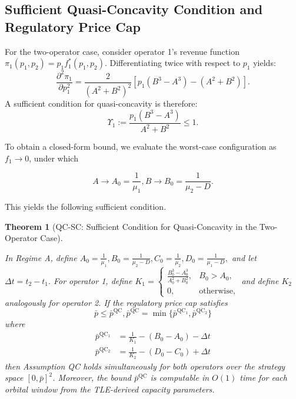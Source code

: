 \documentclass[review,3p,authoryear]{elsarticle}
\newtheorem{theorem}{Theorem}[section]
\begin{document}
\subsection{Sufficient Quasi-Concavity Condition and Regulatory Price Cap}

For the two-operator case, consider operator 1's revenue function ${\pi}_{1}(p_{1},p_{2})=p_{1} f_{1}^{*}(p_{1},p_{2}).$ Differentiating twice with respect to $p_{1}$ yields:
\begin{equation}
\frac{{\partial}^{2} {\pi}_{1}}{{\partial} p_{1}^{2}}= \frac{2}{(A^{2}+B^{2})^{2}} \left[ p_1 (B^{3}-A^{3}) - (A^{2}+B^{2}) \right].
\end{equation}
A sufficient condition for quasi-concavity is therefore:
\begin{equation}
    \Upsilon_1 := \frac{p_1 (B^3 - A^3)}{A^2 + B^2} \le 1.
\end{equation}

To obtain a closed-form bound, we evaluate the worst-case configuration as $f_{1}{\to}0$, under which

\begin{equation}
A{\to}A_{0}=\frac{1}{{\mu}_{1}},B{\to}B_{0}=\frac{1}{{\mu}_{2}-D}.
\end{equation}

This yields the following sufficient condition.

\begin{theorem}[QC-SC: Sufficient Condition for Quasi-Concavity in the Two-Operator Case]\label{thm:qcsc}

In Regime A, define $A_{0}=\frac{1}{{\mu}_{1}},B_{0}=\frac{1}{{\mu}_{2}-D},C_{0}=\frac{1}{{\mu}_{2}},D_{0}=\frac{1}{{\mu}_{1}-D},$ and let ${\Delta}t=t_{2}-t_{1}.$ For operator 1, define $K_{1}=\begin{cases}\frac{B_{0}^{3}-A_{0}^{3}}{A_{0}^{2}+B_{0}^{2}}, & B_{0}>A_{0}, \\ 0, & \text{otherwise},\end{cases}$ and define $K_{2}$ analogously for operator 2. If the regulatory price cap satisfies
\begin{equation}
    \bar{p} \le \bar{p}^{\mathrm{QC}}, \bar{p}^{\mathrm{QC}} = \min \{\bar{p}^{\mathrm{QC_1}}, \bar{p}^{\mathrm{QC_2}}\}
\end{equation}
where
\begin{align}
    \bar{p}^{\mathrm{QC_1}} &= \frac{1}{K_1} - (B_0 - A_0) - \Delta t \\
    \bar{p}^{\mathrm{QC_2}} &= \frac{1}{K_2} - (D_0 - C_0) + \Delta t
\end{align}
then Assumption QC holds simultaneously for both operators over the strategy space $[0, \bar{p}]^{2}$. Moreover, the bound $\bar{p}^{\mathrm{QC}}$ is computable in $O(1)$ time for each orbital window from the TLE-derived capacity parameters.
\end{theorem}
\end{document}
